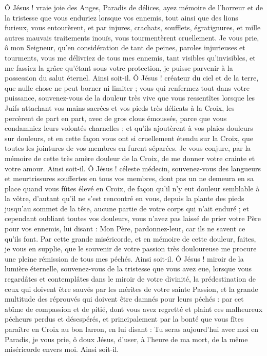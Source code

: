 \priere Ô Jésus ! vraie joie des Anges, Paradis de délices, ayez mémoire de l’horreur et de la tristesse que vous enduriez lorsque vos ennemis, tout ainsi que des lions furieux, vous entourèrent, et par injures, crachats, soufflets, égratignures, et mille autres mauvais traitements inouïs, vous tourmentèrent cruellement. Je vous prie, ô mon Seigneur, qu’en considération de tant de peines, paroles injurieuses et tourments, vous me délivriez de tous mes ennemis, tant visibles qu’invisibles, et me fassiez la grâce qu’étant sous votre protection, je puisse parvenir à la possession du salut éternel. Ainsi soit-il.
\priere Ô Jésus ! créateur du ciel et de la terre, que nulle chose ne peut borner ni limiter ; vous qui renfermez tout dans votre puissance, souvenez-vous de la douleur très vive que vous ressentîtes lorsque les Juifs attachant vos mains sacrées et vos pieds très délicats à la Croix, les percèrent de part en part, avec de gros clous émoussés, parce que vous condamniez leurs volontés charnelles ; et qu’ils ajoutèrent à vos plaies douleurs sur douleurs, et en cette façon vous ont si cruellement étendu sur la Croix, que toutes les jointures de vos membres en furent séparées. Je vous conjure, par la mémoire de cette très amère douleur de la Croix, de me donner votre crainte et votre amour. Ainsi soit-il.
\priere Ô Jésus ! céleste médecin, souvenez-vous des langueurs et meurtrissures souffertes en tous vos membres, dont pas un ne demeura en sa place quand vous fûtes élevé en Croix, de façon qu’il n’y eut douleur semblable à la vôtre, d’autant qu’il ne s’est rencontré en vous, depuis la plante des pieds jusqu’au sommet de la tête, aucune partie de votre corps qui n’ait enduré ; et cependant oubliant toutes vos douleurs, vous n’avez pas laissé de prier votre Père pour vos ennemis, lui disant : Mon Père, pardonnez-leur, car ils ne savent ce qu’ils font. Par cette grande miséricorde, et en mémoire de cette douleur, faites, je vous en supplie, que le souvenir de votre passion très douloureuse me procure une pleine rémission de tous mes péchés. Ainsi soit-il.
\priere Ô Jésus ! miroir de la lumière éternelle, souvenez-vous de la tristesse que vous avez eue, lorsque vous regardâtes et contemplâtes dans le miroir de votre divinité, la prédestination de ceux qui doivent être sauvés par les mérites de votre sainte Passion, et la grande multitude des réprouvés qui doivent être damnés pour leurs péchés : par cet abîme de compassion et de pitié, dont vous avez regretté et plaint ces malheureux pécheurs perdus et désespérés, et principalement par la bonté que vous fîtes paraître en Croix au bon larron, en lui disant : Tu seras aujourd’hui avec moi en Paradis, je vous prie, ô doux Jésus, d’user, à l’heure de ma mort, de la même miséricorde envers moi. Ainsi soit-il.

